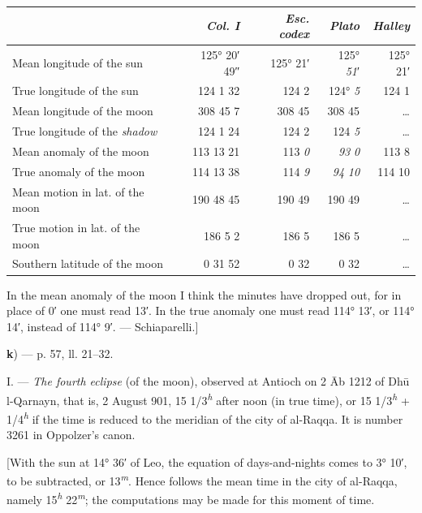 \documentclass[11pt]{article}
\newcommand{\AbjadZero}{{\NallinoSigns\symbol{"E000}}}
\newcommand{\Pg}[1]{\marginpar{\footnotesize\color{gray}#1}}
\begin{document}
\Pg{I 231}\begin{center}\small\begin{tabular}{>{\raggedright\arraybackslash}p{50mm}rrrr}
 & \emph{Col. I} & \emph{Esc. codex} & \emph{Plato} & \emph{Halley} \\
\midrule
Mean longitude of the sun & 125° 20′ 49″ & 125° 21′ & 125° \emph{51}′ & 125° 21′ \\
True longitude of the sun & 124 1 32 & 124 2 & 124° \emph{5} & 124 1 \\
Mean longitude of the moon & 308 45 7 & 308 45 & 308 45 & … \\
True longitude of the \emph{shadow} & 124 1 24 & 124 2 & 124 \emph{5} & … \\
Mean anomaly of the moon & 113 13 21 & 113 \emph{0} & \emph{93} \emph{0} & 113 8 \\
True anomaly of the moon & 114 13 38 & 114 \emph{9} & \emph{94} \emph{10} & 114 10 \\
Mean motion in lat. of the moon & 190 48 45 & 190 49 & 190 49 & … \\
True motion in lat. of the moon & 186 5 2 & 186 5 & 186 5 & … \\
Southern latitude of the moon & 0 31 52 & 0 32 & 0 32 & … \\
\end{tabular}\end{center}
\par In the mean anomaly of the moon I think the minutes have dropped out, for in place of \AbjadZero{} 0′ one must read  13′. In the true anomaly one must read  114° 13′, or  114° 14′, instead of  114° 9′. — Schiaparelli.]\par
\par\begin{center}\textbf{k}) — p. 57, ll. 21–32.\end{center}
\par I. — \emph{The fourth eclipse} (of the moon), observed at Antioch on 2 Āb 1212 of Dhū l-Qarnayn, that is, 2 August 901, 15 1/3\textsuperscript{\itshape h} after noon (in true time), or 15 1/3\textsuperscript{\itshape h} + 1/4\textsuperscript{\itshape h} if the time is reduced to the meridian of the city of al-Raqqa. It is number 3261 in Oppolzer's canon.\par
\par [With the sun at 14° 36′ of Leo, the equation of days-and-nights comes to 3° 10′, to be subtracted, or 13\textsuperscript{\itshape m}. Hence follows the mean time in the city of al-Raqqa, namely 15\textsuperscript{\itshape h} 22\textsuperscript{\itshape m}; the computations may be made for this moment of time.\par
\end{document}
